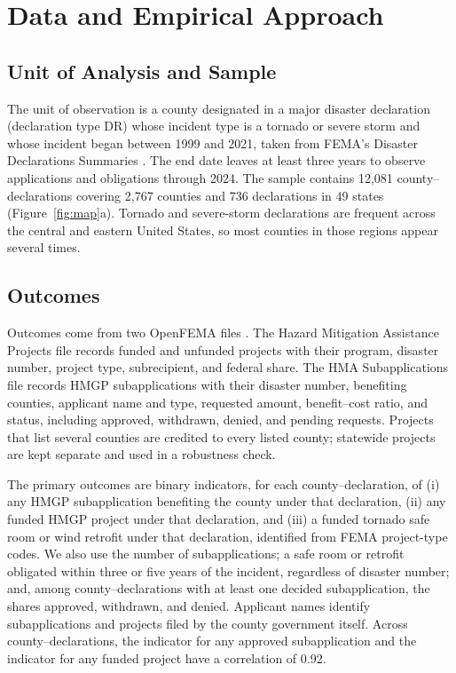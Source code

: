 \section{Data and Empirical Approach}
\label{sec:data}

\subsection{Unit of Analysis and Sample}

The unit of observation is a county designated in a major disaster declaration (declaration type DR) whose incident type is a tornado or severe storm and whose incident began between 1999 and 2021, taken from FEMA's Disaster Declarations Summaries \parencite{openfema2026}. The end date leaves at least three years to observe applications and obligations through 2024. The sample contains 12,081 county--declarations covering 2,767 counties and 736 declarations in 49 states (Figure~\ref{fig:map}a). Tornado and severe-storm declarations are frequent across the central and eastern United States, so most counties in those regions appear several times.

\subsection{Outcomes}

Outcomes come from two OpenFEMA files \parencite{openfema2026}. The Hazard Mitigation Assistance Projects file records funded and unfunded projects with their program, disaster number, project type, subrecipient, and federal share. The HMA Subapplications file records HMGP subapplications with their disaster number, benefiting counties, applicant name and type, requested amount, benefit--cost ratio, and status, including approved, withdrawn, denied, and pending requests. Projects that list several counties are credited to every listed county; statewide projects are kept separate and used in a robustness check.

The primary outcomes are binary indicators, for each county--declaration, of (i) any HMGP subapplication benefiting the county under that declaration, (ii) any funded HMGP project under that declaration, and (iii) a funded tornado safe room or wind retrofit under that declaration, identified from FEMA project-type codes. We also use the number of subapplications; a safe room or retrofit obligated within three or five years of the incident, regardless of disaster number; and, among county--declarations with at least one decided subapplication, the shares approved, withdrawn, and denied. Applicant names identify subapplications and projects filed by the county government itself. Across county--declarations, the indicator for any approved subapplication and the indicator for any funded project have a correlation of 0.92.

